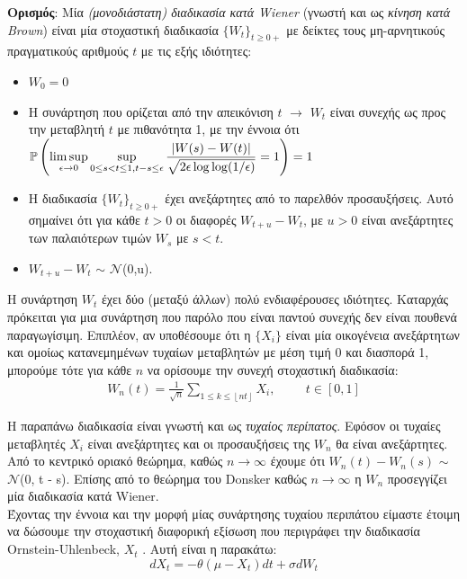 \documentclass[11pt]{article} %
\numberwithin{equation}{subsection}
\begin{document}
\textbf{Ορισμός}: Μία \textit{(μονοδιάστατη) διαδικασία κατά Wiener} (γνωστή και ως \textit{κίνηση κατά Brown}) είναι μία στοχαστική διαδικασία $\{W_t\}_{t \geq 0+}$ με δείκτες τους μη-αρνητικούς πραγματικούς αριθμούς $t$ με τις εξής ιδιότητες:
\begin{itemize}
  \item $W_0 = 0$
  \item Η συνάρτηση που ορίζεται από την απεικόνιση $t$ $\rightarrow$ $W_t$ είναι συνεχής ως προς την μεταβλητή $t$ με πιθανότητα 1, με την έννοια ότι $\displaystyle \mathbb{P}\left(\limsup\limits_{\epsilon \rightarrow 0} \sup_{0 \leq s < t \leq 1, t - s \leq \epsilon} \frac{\abs{W(s) - W(t)}}{\sqrt{2 \epsilon \log \log (1/\epsilon)}} = 1\right) = 1$
  \item Η διαδικασία $\{W_t\}_{t \geq 0+}$ έχει ανεξάρτητες από το παρελθόν προσαυξήσεις. Αυτό σημαίνει ότι για κάθε $t > 0$ οι διαφορές $W_{t + u} - W_t$, με $u > 0$ είναι ανεξάρτητες των παλαιότερων τιμών $W_s$ με $s < t$.
  \item $W_{t + u} - W_t$ $\sim$ $\mathcal{N}$(0,u). 
\end{itemize}

Η συνάρτηση $W_t$ έχει δύο (μεταξύ άλλων) πολύ ενδιαφέρουσες ιδιότητες. Καταρχάς πρόκειται για μια συνάρτηση που παρόλο που είναι παντού συνεχής δεν είναι πουθενά παραγωγίσιμη. Επιπλέον, αν υποθέσουμε ότι η $\{X_i\}$ είναι μία οικογένεια ανεξάρτητων και ομοίως κατανεμημένων τυχαίων μεταβλητών με μέση τιμή 0 και διασπορά 1, μπορούμε τότε για  κάθε $n$ να ορίσουμε την συνεχή στοχαστική διαδικασία:\\
\begin{align*}
W_n (t) = \frac{1}{\sqrt{n}} \sum_{1 \leq k \leq \left \lfloor{nt}\right \rfloor } X_i, \hspace{1cm} t \in [0, 1]
\end{align*}

Η παραπάνω διαδικασία είναι γνωστή και ως \textit{τυχαίος περίπατος}. Εφόσον οι τυχαίες μεταβλητές $X_i$ είναι ανεξάρτητες και οι προσαυξήσεις της $W_n$ θα είναι ανεξάρτητες. Από το κεντρικό οριακό θεώρημα, καθώς $n \rightarrow \infty$ έχουμε ότι $W_n (t) - W_n (s)$ $\sim$ $\mathcal{N}$(0, t - s). Επίσης από το θεώρημα του Donsker καθώς $n \rightarrow \infty$ η $W_n$ προσεγγίζει μία διαδικασία κατά Wiener. \\

Έχοντας την έννοια και την μορφή μίας συνάρτησης τυχαίου περιπάτου είμαστε έτοιμη να δώσουμε την στοχαστική διαφορική εξίσωση που περιγράφει την διαδικασία Ornstein-Uhlenbeck, $X_t$ \cite{ounoise}. Αυτή είναι η παρακάτω:\\
\begin{equation}
dX_t = -\theta(\mu - X_t)dt + \sigma dW_t
\end{equation}
\end{document}
